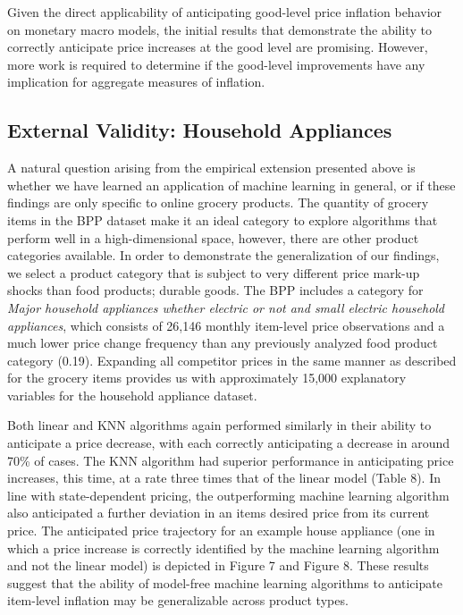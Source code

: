\documentclass[11pt]{article}
\begin{document}
Given the direct applicability of anticipating good-level price inflation behavior on monetary macro models, the initial results that demonstrate the ability to correctly anticipate price increases at the good level are promising. However, more work is required to determine if the good-level improvements have any implication for aggregate measures of inflation. 

\subsection{External Validity: Household Appliances}
A natural question arising from the empirical extension presented above is whether we have learned an application of machine learning in general, or if these findings are only specific to online grocery products. The quantity of grocery items in the BPP dataset make it an ideal category to explore algorithms that perform well in a high-dimensional space, however, there are other product categories available. In order to demonstrate the generalization of our findings, we select a product category that is subject to very different price mark-up shocks than food products; durable goods. The BPP includes a category for \textit{Major household appliances whether electric or not and small electric household appliances}, which consists of 26,146 monthly item-level price observations and a much lower price change frequency than any previously analyzed food product category (0.19). Expanding all competitor prices in the same manner as described for the grocery items provides us with approximately 15,000 explanatory variables for the household appliance dataset.

Both linear and KNN algorithms again performed similarly in their ability to anticipate a price decrease, with each correctly anticipating a decrease in around 70\% of cases. The KNN algorithm had superior performance in anticipating price increases, this time, at a rate three times that of the linear model (Table 8). In line with state-dependent pricing, the outperforming machine learning algorithm also anticipated a further deviation in an items desired price from its current price. The anticipated price trajectory for an example house appliance (one in which a price increase is correctly identified by the machine learning algorithm and not the linear model) is depicted in Figure 7 and Figure 8. These results suggest that the ability of model-free machine learning algorithms to anticipate item-level inflation may be generalizable across product types.  
\end{document}
